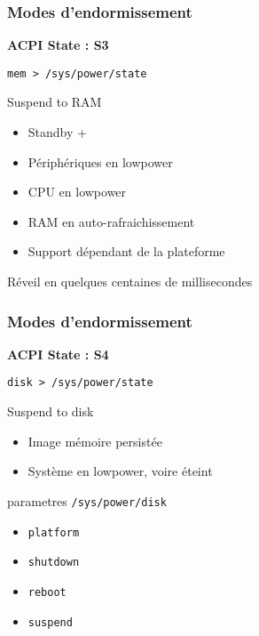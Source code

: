 \begin{frame}
	\frametitle{Modes d'endormissement}
	\textbf{ACPI State : S3}

	\texttt{mem > /sys/power/state}
	\begin{block}{Suspend to RAM}
		\begin{itemize}
			\item Standby +
			\item Périphériques en lowpower
			\item CPU en lowpower
			\item RAM en auto-rafraichissement
			\item Support dépendant de la plateforme
		\end{itemize}
	\end{block}
	Réveil en quelques centaines de millisecondes
\end{frame}
\begin{frame}
	\frametitle{Modes d'endormissement}
	\textbf{ACPI State : S4}

	\texttt{disk > /sys/power/state}
	\begin{block}{Suspend to disk}
		\begin{itemize}
			\item Image mémoire persistée
			\item Système en lowpower, voire éteint
		\end{itemize}
	\end{block}
	\begin{block}{parametres}
		\texttt{/sys/power/disk}
		\begin{itemize}
			\item \texttt{platform}
			\item \texttt{shutdown}
			\item \texttt{reboot}
			\item \texttt{suspend}
		\end{itemize}
	\end{block}
\end{frame}

